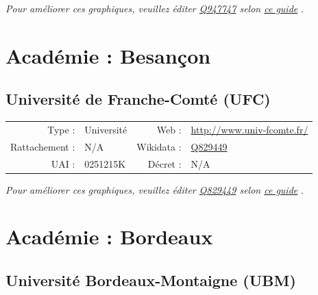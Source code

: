 \documentclass[12pt,french,landscape]{article}
\begin{document}
\textit{\scriptsize Pour améliorer ces graphiques, veuillez éditer \href{https://www.wikidata.org/entity/Q947747}{Q947747}  selon \href{https://github.com/cpesr/wikidataESR/blob/master/Rmd/wikidataESR.md}{ce guide}}
.


\newpage

\hypertarget{acaduxe9mie-besanuxe7on}{%
\section{Académie : Besançon}\label{acaduxe9mie-besanuxe7on}}

\hypertarget{universituxe9-de-franche-comtuxe9-ufc}{%
\subsection{Université de Franche-Comté
(UFC)}\label{universituxe9-de-franche-comtuxe9-ufc}}

\begin{tabular*}{0.45\textwidth}{rp{2cm}rl}  
\hline  
Type : & Université & Web : &\href{http://www.univ-fcomte.fr/}{http://www.univ-fcomte.fr/} \\  
Rattachement : & N/A & Wikidata : & \href{https://www.wikidata.org/entity/Q829449}{Q829449} \\  
UAI : & 0251215K & Décret : & N/A \\  
\hline  
\end{tabular*}

\textit{\scriptsize Pour améliorer ces graphiques, veuillez éditer \href{https://www.wikidata.org/entity/Q829449}{Q829449}  selon \href{https://github.com/cpesr/wikidataESR/blob/master/Rmd/wikidataESR.md}{ce guide}}
.


\newpage

\hypertarget{acaduxe9mie-bordeaux}{%
\section{Académie : Bordeaux}\label{acaduxe9mie-bordeaux}}

\hypertarget{universituxe9-bordeaux-montaigne-ubm}{%
\subsection{Université Bordeaux-Montaigne
(UBM)}\label{universituxe9-bordeaux-montaigne-ubm}}
\end{document}
